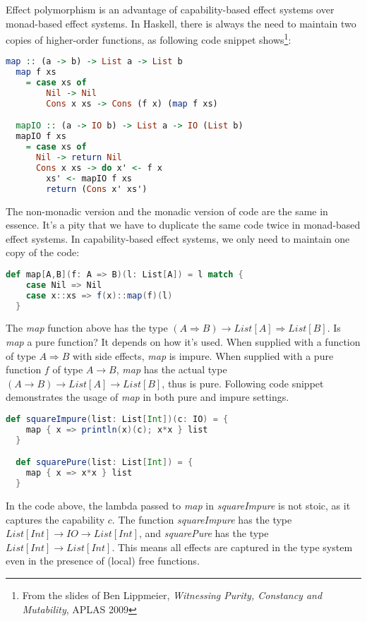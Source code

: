 Effect polymorphism is an advantage of capability-based effect systems
over monad-based effect systems. In Haskell, there is always the need
to maintain two copies of higher-order functions, as following code
snippet shows\footnote{From the slides of Ben Lippmeier,
  \emph{Witnessing Purity, Constancy and Mutability}, APLAS 2009}:

\begin{lstlisting}[language=Haskell]
  map :: (a -> b) -> List a -> List b
  map f xs
    = case xs of
        Nil -> Nil
        Cons x xs -> Cons (f x) (map f xs)

  mapIO :: (a -> IO b) -> List a -> IO (List b)
  mapIO f xs
    = case xs of
      Nil -> return Nil
      Cons x xs -> do x' <- f x
        xs' <- mapIO f xs
        return (Cons x' xs')
\end{lstlisting}

The non-monadic version and the monadic version of code are the same
in essence. It's a pity that we have to duplicate the same code twice
in monad-based effect systems. In capability-based effect systems, we
only need to maintain one copy of the code:

\begin{lstlisting}[language=Scala]
  def map[A,B](f: A => B)(l: List[A]) = l match {
    case Nil => Nil
    case x::xs => f(x)::map(f)(l)
  }
\end{lstlisting}

The \emph{map} function above has the type
$(A \Rightarrow B) \to List[A] \Rightarrow List[B]$. Is \emph{map} a
pure function? It depends on how it's used. When supplied with a
function of type $A \Rightarrow B$ with side effects, \emph{map} is
impure. When supplied with a pure function $f$ of type $A \to B$,
\emph{map} has the actual type $(A \to B) \to List [A] \to List[B]$,
thus is pure. Following code snippet demonstrates the usage of
\emph{map} in both pure and impure settings.

\begin{lstlisting}[language=Scala]
  def squareImpure(list: List[Int])(c: IO) = {
    map { x => println(x)(c); x*x } list
  }

  def squarePure(list: List[Int]) = {
    map { x => x*x } list
  }
\end{lstlisting}

In the code above, the lambda passed to \emph{map} in
\emph{squareImpure} is not stoic, as it captures the capability
$c$. The function \emph{squareImpure} has the type
$List[Int] \to IO \to List[Int]$, and \emph{squarePure} has the type
$List[Int] \to List[Int]$. This means all effects are captured in the
type system even in the presence of (local) free functions.

